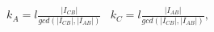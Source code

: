 \begin{equation}
\begin{array}{ll}
k_{A}=l \frac{|I_{CB}|}{gcd(|I_{CB}|,|I_{AB}|)} & k_{C}=l
\frac{|I_{AB}|}{gcd(|I_{CB}|,|I_{AB}|)},
\end{array}
\end{equation}

